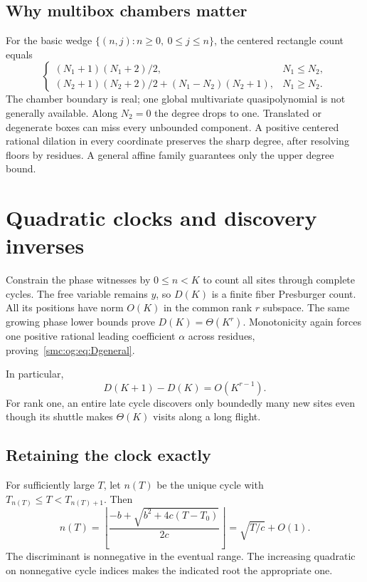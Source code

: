 \documentclass[11pt,letterpaper]{article}
\numberwithin{equation}{section}
\theoremstyle{definition}
\theoremstyle{remark}
\begin{document}
\subsection{Why multibox chambers matter}
For the basic wedge $\{(n,j):n\ge0,\ 0\le j\le n\}$, the centered rectangle count equals
\[
 \begin{cases}
 (N_1+1)(N_1+2)/2,&N_1\le N_2,\\[2pt]
 (N_2+1)(N_2+2)/2+(N_1-N_2)(N_2+1),&N_1\ge N_2.
 \end{cases}
\]
The chamber boundary is real; one global multivariate quasipolynomial is not generally available. Along $N_2=0$ the degree drops to one. Translated or degenerate boxes can miss every unbounded component. A positive centered rational dilation in every coordinate preserves the sharp degree, after resolving floors by residues. A general affine family guarantees only the upper degree bound.

\section{Quadratic clocks and discovery inverses}\label{smc:og:sec:clock}
Constrain the phase witnesses by $0\le n<K$ to count all sites through complete cycles. The free variable remains $y$, so $D(K)$ is a finite fiber Presburger count. All its positions have norm $O(K)$ in the common rank $r$ subspace. The same growing phase lower bounds prove $D(K)=\Theta(K^r)$. Monotonicity again forces one positive rational leading coefficient $\alpha$ across residues, proving~\eqref{smc:og:eq:Dgeneral}.

In particular,
\begin{equation}\label{smc:og:eq:newpercycle}
 D(K+1)-D(K)=O(K^{r-1}).
\end{equation}
For rank one, an entire late cycle discovers only boundedly many new sites even though its shuttle makes $\Theta(K)$ visits along a long flight.

\subsection{Retaining the clock exactly}
For sufficiently large $T$, let $n(T)$ be the unique cycle with $T_{n(T)}\le T<T_{n(T)+1}$. Then
\begin{equation}\label{smc:og:eq:rootclock}
 n(T)=\left\lfloor\frac{-b+\sqrt{b^2+4c(T-T_0)}}{2c}\right\rfloor
       =\sqrt{T/c}+O(1).
\end{equation}
The discriminant is nonnegative in the eventual range. The increasing quadratic on nonnegative cycle indices makes the indicated root the appropriate one.
\end{document}
